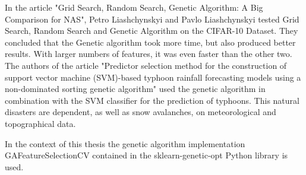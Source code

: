 \documentclass[../masterarbeit.tex]{subfiles}
\begin{document}
In the article "Grid Search, Random Search, Genetic Algorithm: {A} Big Comparison for {NAS}", Petro Liashchynskyi and Pavlo Liashchynskyi tested Grid Search, Random Search and Genetic Algorithm on the CIFAR-10 Dataset. They concluded that the Genetic algorithm took more time, but also produced better results. With larger numbers of features, it was even faster than the other two. \autocite[]{DBLP:1912}
The authors of the article "Predictor selection method for the construction of support vector machine (SVM)-based typhoon rainfall forecasting models using a non-dominated sorting genetic algorithm" \textcite[]{Yang:2018} used the genetic algorithm in combination with the SVM classifier for the prediction of typhoons. This natural disasters are dependent, as well as snow avalanches, on meteorological and topographical data. 

In the context of this thesis the genetic algorithm implementation GAFeatureSelectionCV contained in the sklearn-genetic-opt Python library \textcite{Sklearn_genetic_feature_docu:2022} is used.
\end{document}
